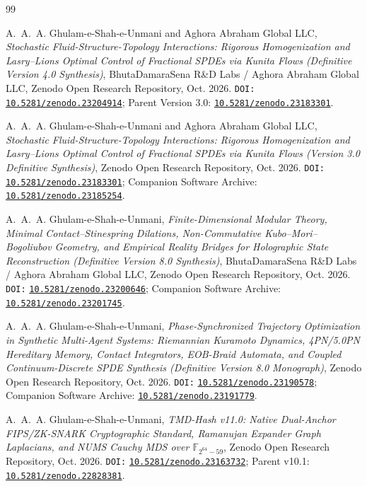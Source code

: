 \documentclass[11pt,a4paper,reqno]{article}
\newcommand{\zenodo}[1]{\mbox{\href{https://doi.org/10.5281/zenodo.#1}{\texttt{10.5281/zenodo.#1}}}}
\theoremstyle{plain}
\theoremstyle{definition}
\theoremstyle{remark}
\numberwithin{equation}{section}
\begin{document}
\clearpage
\begin{thebibliography}{99}

A.~A.~A. Ghulam-e-Shah-e-Unmani and {Aghora Abraham Global LLC},
\emph{Stochastic Fluid-Structure-Topology Interactions: Rigorous Homogenization and Lasry--Lions Optimal Control of Fractional SPDEs via Kunita Flows (Definitive Version 4.0 Synthesis)},
BhutaDamaraSena R\&D Labs / Aghora Abraham Global LLC, Zenodo Open Research Repository, Oct. 2026.
\texttt{DOI:} \zenodo{23204914}; Parent Version 3.0: \zenodo{23183301}.

A.~A.~A. Ghulam-e-Shah-e-Unmani and {Aghora Abraham Global LLC},
\emph{Stochastic Fluid-Structure-Topology Interactions: Rigorous Homogenization and Lasry--Lions Optimal Control of Fractional SPDEs via Kunita Flows (Version 3.0 Definitive Synthesis)},
Zenodo Open Research Repository, Oct. 2026.
\texttt{DOI:} \zenodo{23183301}; Companion Software Archive: \zenodo{23185254}.

A.~A.~A. Ghulam-e-Shah-e-Unmani,
\emph{Finite-Dimensional Modular Theory, Minimal Contact--Stinespring Dilations, Non-Commutative Kubo--Mori--Bogoliubov Geometry, and Empirical Reality Bridges for Holographic State Reconstruction (Definitive Version 8.0 Synthesis)},
BhutaDamaraSena R\&D Labs / Aghora Abraham Global LLC, Zenodo Open Research Repository, Oct. 2026.
\texttt{DOI:} \zenodo{23200646}; Companion Software Archive: \zenodo{23201745}.

A.~A.~A. Ghulam-e-Shah-e-Unmani,
\emph{Phase-Synchronized Trajectory Optimization in Synthetic Multi-Agent Systems: Riemannian Kuramoto Dynamics, 4PN/5.0PN Hereditary Memory, Contact Integrators, EOB-Braid Automata, and Coupled Continuum-Discrete SPDE Synthesis (Definitive Version 8.0 Monograph)},
Zenodo Open Research Repository, Oct. 2026.
\texttt{DOI:} \zenodo{23190578}; Companion Software Archive: \zenodo{23191779}.

A.~A.~A. Ghulam-e-Shah-e-Unmani,
\emph{TMD-Hash v11.0: Native Dual-Anchor FIPS/ZK-SNARK Cryptographic Standard, Ramanujan Expander Graph Laplacians, and NUMS Cauchy MDS over $\mathbb{F}_{2^{64}-59}$},
Zenodo Open Research Repository, Oct. 2026.
\texttt{DOI:} \zenodo{23163732}; Parent v10.1: \zenodo{22828381}.


\end{thebibliography}
\end{document}
